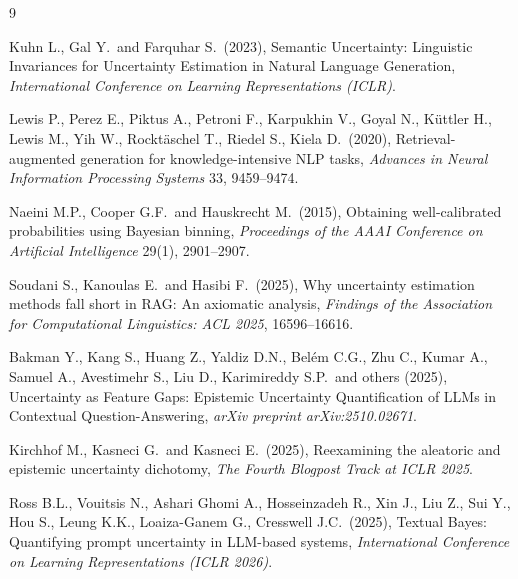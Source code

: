 \documentclass[twoside]{article}
\begin{document}
\vspace{-10pt} 
\begin{thebibliography}{9}

Kuhn L., Gal Y.\ and Farquhar S.\ (2023), Semantic Uncertainty: Linguistic Invariances for Uncertainty Estimation in Natural Language Generation, \textit{International Conference on Learning Representations (ICLR)}.

Lewis P., Perez E., Piktus A., Petroni F., Karpukhin V., Goyal N., K\"{u}ttler H., Lewis M., Yih W., Rockt\"{a}schel T., Riedel S., Kiela D.\ (2020), Retrieval-augmented generation for knowledge-intensive NLP tasks, \textit{Advances in Neural Information Processing Systems} 33, 9459--9474.

Naeini M.P., Cooper G.F.\ and Hauskrecht M.\ (2015), Obtaining well-calibrated probabilities using Bayesian binning, \textit{Proceedings of the AAAI Conference on Artificial Intelligence} 29(1), 2901--2907.

Soudani S., Kanoulas E.\ and Hasibi F.\ (2025), Why uncertainty estimation methods fall short in RAG: An axiomatic analysis, \textit{Findings of the Association for Computational Linguistics: ACL 2025}, 16596--16616.

Bakman Y., Kang S., Huang Z., Yaldiz D.N., Bel\'em C.G., Zhu C., Kumar A., Samuel A., Avestimehr S., Liu D., Karimireddy S.P.\ and others (2025), Uncertainty as Feature Gaps: Epistemic Uncertainty Quantification of LLMs in Contextual Question-Answering, \textit{arXiv preprint arXiv:2510.02671}.

Kirchhof M., Kasneci G.\ and Kasneci E.\ (2025), Reexamining the aleatoric and epistemic uncertainty dichotomy, \textit{The Fourth Blogpost Track at ICLR 2025}.

Ross B.L., Vouitsis N., Ashari Ghomi A., Hosseinzadeh R., Xin J., Liu Z., Sui Y., Hou S., Leung K.K., Loaiza-Ganem G., Cresswell J.C.\ (2025), Textual Bayes: Quantifying prompt uncertainty in LLM-based systems, \textit{International Conference on Learning Representations (ICLR 2026)}.

\end{thebibliography}
\end{document}
